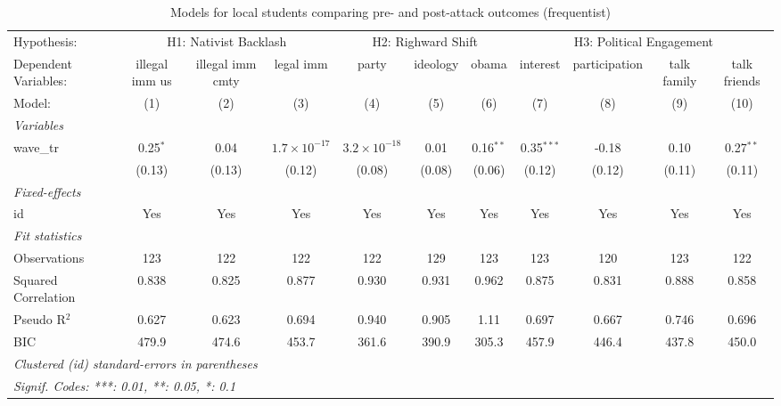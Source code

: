 
\begin{table}[htbp]
   \caption{\label{tab:first_diff_FE_ctrl} Models for local students comparing pre- and post-attack outcomes (frequentist)}
   \centering
   \begin{tabular}{lcccccccccc}
      \tabularnewline \midrule \midrule
      Hypothesis: & \multicolumn{3}{c}{H1: Nativist Backlash} & \multicolumn{3}{c}{H2: Righward Shift} & \multicolumn{4}{c}{H3: Political Engagement} \\ 
      Dependent Variables: & illegal imm us & illegal imm cmty & legal imm             & party                 & ideology & obama       & interest     & participation & talk family & talk friends\\  
      Model:               & (1)            & (2)              & (3)                   & (4)                   & (5)      & (6)         & (7)          & (8)           & (9)         & (10)\\  
      \midrule
      \emph{Variables}\\
      wave\_tr             & 0.25$^{*}$     & 0.04             & $1.7\times 10^{-17}$  & $3.2\times 10^{-18}$  & 0.01     & 0.16$^{**}$ & 0.35$^{***}$ & -0.18         & 0.10        & 0.27$^{**}$\\   
                           & (0.13)         & (0.13)           & (0.12)                & (0.08)                & (0.08)   & (0.06)      & (0.12)       & (0.12)        & (0.11)      & (0.11)\\   
      \midrule
      \emph{Fixed-effects}\\
      id                   & Yes            & Yes              & Yes                   & Yes                   & Yes      & Yes         & Yes          & Yes           & Yes         & Yes\\  
      \midrule
      \emph{Fit statistics}\\
      Observations         & 123            & 122              & 122                   & 122                   & 129      & 123         & 123          & 120           & 123         & 122\\  
      Squared Correlation  & 0.838          & 0.825            & 0.877                 & 0.930                 & 0.931    & 0.962       & 0.875        & 0.831         & 0.888       & 0.858\\  
      Pseudo R$^2$         & 0.627          & 0.623            & 0.694                 & 0.940                 & 0.905    & 1.11        & 0.697        & 0.667         & 0.746       & 0.696\\  
      BIC                  & 479.9          & 474.6            & 453.7                 & 361.6                 & 390.9    & 305.3       & 457.9        & 446.4         & 437.8       & 450.0\\  
      \midrule \midrule
      \multicolumn{11}{l}{\emph{Clustered (id) standard-errors in parentheses}}\\
      \multicolumn{11}{l}{\emph{Signif. Codes: ***: 0.01, **: 0.05, *: 0.1}}\\
   \end{tabular}
\end{table}


